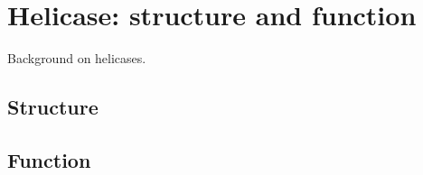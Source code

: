 \chapter{Helicase: structure and function}
\label{helicase}

Background on helicases.

\section{Structure}

\section{Function}